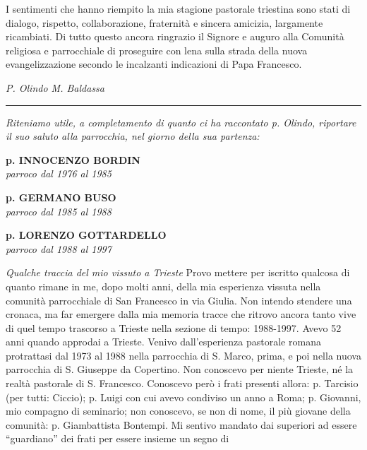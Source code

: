 I sentimenti che hanno riempito la mia stagione pastorale triestina sono stati di dialogo, rispetto, collaborazione, fraternità e sincera amicizia, largamente ricambiati. Di tutto questo ancora ringrazio il Signore e auguro alla Comunità religiosa e parrocchiale di proseguire con lena sulla strada della nuova evangelizzazione secondo le incalzanti indicazioni di Papa Francesco. 
\begin{flushright}
\textit{P. Olindo M. Baldassa}
\end{flushright}
\begin{center}
	\noindent\rule{\textwidth}{0.4pt}
\end{center}
\textit{Riteniamo utile, a completamento di quanto ci ha raccontato p. Olindo, riportare il suo saluto alla parrocchia, nel giorno della sua partenza:}
\bigskip

\bigskip
\begin{center}
\textbf{\Large p. INNOCENZO BORDIN}\\
	\textit{parroco dal 1976 al 1985}
\end{center}
\bigskip
\begin{center}
\textbf{\Large p. GERMANO BUSO}\\
	\textit{parroco dal 1985 al 1988}
\end{center}
\bigskip
\begin{center}
\textbf{\Large p. LORENZO GOTTARDELLO}\\
	\textit{parroco dal 1988 al 1997}
\end{center}
\bigbreak
\textit{Qualche traccia del mio vissuto a Trieste}
\medbreak
Provo mettere per iscritto qualcosa di quanto rimane in me, dopo molti anni, della mia
esperienza vissuta nella comunità parrocchiale di San Francesco in via Giulia. 
Non intendo stendere una cronaca, ma far emergere dalla mia memoria tracce che ritrovo ancora 
tanto vive di quel tempo trascorso a Trieste nella sezione di tempo: 1988-1997.
Avevo 52 anni quando approdai a Trieste. Venivo dall’esperienza pastorale romana protrattasi dal 
1973 al 1988 nella parrocchia di S. Marco, prima, e poi nella nuova parrocchia di S. Giuseppe da 
Copertino.
Non conoscevo per niente Trieste, né la realtà pastorale di S. Francesco. Conoscevo però i 
frati presenti allora: p. Tarcisio (per tutti: Ciccio); p. Luigi con cui avevo condiviso un anno a 
Roma; p. Giovanni, mio compagno di seminario; non conoscevo, se non di nome, il più giovane 
della comunità: p. Giambattista Bontempi.
Mi sentivo mandato dai superiori ad essere “guardiano” dei frati per essere insieme un segno di 
